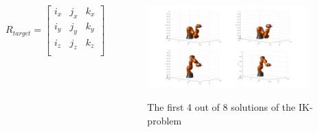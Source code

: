 \begin{frame}
\begin{columns}
\[
R_{target} = 
\begin{bmatrix}
i_x & j_x & k_x\\
i_y & j_y & k_y\\
i_z & j_z & k_z\\
\end{bmatrix}
\]
\begin{center}
\begin{figure}[!htb]
\centering
\includegraphics[width=0.9\textwidth]{../images/ik-4-solutions.png}\\
\caption{The first 4 out of 8 solutions of the IK-problem}
\end{figure}
\end{center}
\end{columns}
\end{frame}


